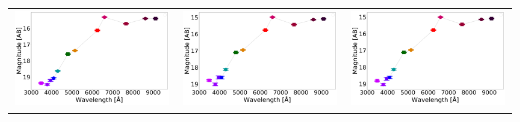 \begin{table}[!h]
\begin{tabular}{ccc}
\includegraphics[width=0.3\linewidth, clip]{photopectrum_splus_MC0133-025038_aper.pdf} & \includegraphics[width=0.3\linewidth, clip]{photopectrum_splus_MC0133-025038_auto.pdf} & \includegraphics[width=0.3\linewidth, clip]{photopectrum_splus_MC0133-025038_petro.pdf} \\
\end{tabular}
\end{table}

